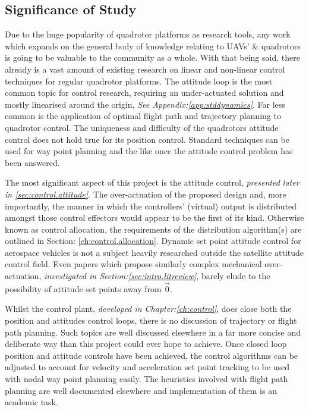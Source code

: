 \subsection{Significance of Study}
\label{subsec:intro.foreward.significance}
Due to the huge popularity of quadrotor platforms as research tools, any work which expands on the general body of knowledge relating to UAVs' \& quadrotors is going to be valuable to the community as a whole. With that being said, there already is a vast amount of existing research on linear and non-linear control techniques for regular quadrotor platforms. The attitude loop is the most common topic for control research, requiring an under-actuated solution and mostly linearised around the origin, \emph{See Appendix:\ref{app:stddynamics}}. Far less common is the application of optimal flight path and trajectory planning to quadrotor control. The uniqueness and difficulty of the quadrotors attitude control does not hold true for its position control. Standard techniques can be used for way point planning and the like once the attitude control problem has been answered.
\par
The most significant aspect of this project is the attitude control, \emph{presented later in \ref{sec:control.attitude}}. The over-actuation of the proposed design and, more importantly, the manner in which the controllers' (virtual) output is distributed amongst those control effectors would appear to be the first of its kind. Otherwise known as control allocation, the requirements of the distribution algorithm(s) are outlined in Section: \ref{ch:control.allocation}. Dynamic set point attitude control for aerospace vehicles is not a subject heavily researched outside the satellite attitude control field. Even papers which propose similarly complex mechanical over-actuation, \emph{investigated in Section:\ref{sec:intro.litreview}}, barely elude to the possibility of attitude set points away from $\vec{0}$.
\par
Whilst the control plant, \emph{developed in Chapter:\ref{ch:control}}, does close both the position  and attitudes control loops, there is no discussion of trajectory or flight path planning. Such topics are well discussed elsewhere in a far more concise and deliberate way than this project could ever hope to achieve. Once closed loop position and attitude controls have been achieved, the control algorithms can be adjusted to account for velocity and acceleration set point tracking to be used with nodal way point planning easily. The heuristics involved with flight path planning are well documented elsewhere and implementation of them is an academic task.
